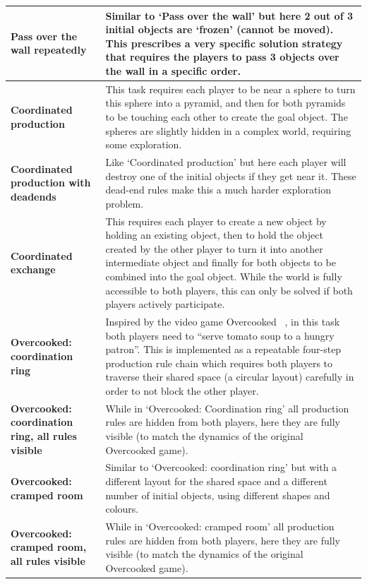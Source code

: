 \documentclass[11pt, a4paper, logo, copyright]{deepmind}
\begin{document}
\begin{appendix}
\begin{longtable}{|>{\raggedright}p{4cm}|p{12cm}|}
\textbf{Pass over the wall repeatedly} & Similar to `Pass over the wall' but here 2 out of 3 initial objects are `frozen' (cannot be moved). This prescribes a very specific solution strategy that requires the players to pass 3 objects over the wall in a specific order. \\ \hline
\textbf{Coordinated production} & This task requires each player to be near a sphere to turn this sphere into a pyramid, and then for both pyramids to be touching each other to create the goal object. The spheres are slightly hidden in a complex world, requiring some exploration. \\ \hline
\textbf{Coordinated production with deadends} & Like `Coordinated production' but here each player will destroy one of the initial objects if they get near it. These dead-end rules make this a much harder exploration problem. \\ \hline
\textbf{Coordinated exchange} & This requires each player to create a new object by holding an existing object, then to hold the object created by the other player to turn it into another intermediate object and finally for both objects to be combined into the goal object. While the world is fully accessible to both players, this can only be solved if both players actively participate. \\ \hline
\textbf{Overcooked: coordination ring} & Inspired by the video game Overcooked ~\citep{https://doi.org/10.48550/arxiv.1910.05789, strouse2021collaborating}, in this task both players need to ``serve tomato soup to a hungry patron''. This is implemented as a repeatable four-step production rule chain which requires both players to traverse their shared space (a circular layout) carefully in order to not block the other player. \\ \hline
\textbf{Overcooked: coordination ring, all rules visible} & While in `Overcooked: Coordination ring' all production rules are hidden from both players, here they are fully visible (to match the dynamics of the original Overcooked game). \\ \hline
\textbf{Overcooked: cramped room} & Similar to `Overcooked: coordination ring' but with a different layout for the shared space and a different number of initial objects, using different shapes and colours. \\ \hline
\textbf{Overcooked: cramped room, all rules visible} & While in `Overcooked: cramped room' all production rules are hidden from both players, here they are fully visible (to match the dynamics of the original Overcooked game). \\ \hline

\end{longtable}
\end{appendix}
\end{document}

